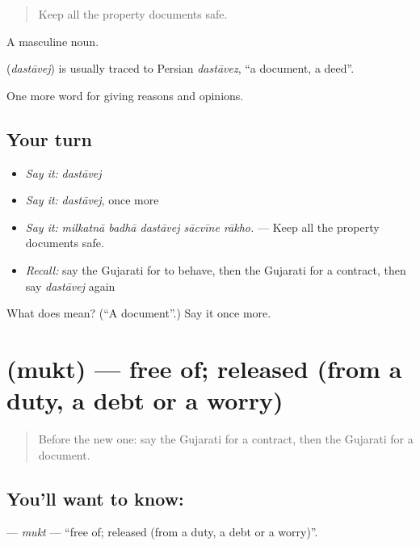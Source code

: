 \begin{quote}
Keep all the property documents safe.
\end{quote}

A masculine noun.

\begin{cousinweb}
\textbf{} (\emph{dastāvej}) is usually traced to Persian \emph{dastāvez}, \textquotedblleft{}a document, a deed\textquotedblright{}.
\end{cousinweb}

\begin{grammarlens}[title={What you've built}]
One more word for giving reasons and opinions.
\end{grammarlens}

\subsection*{Your turn}
\begin{itemize}
\raggedright
  \item \emph{Say it:} \emph{dastāvej}
  \item \emph{Say it:} \emph{dastāvej}, once more
  \item \emph{Say it:} \emph{milkatnā badhā dastāvej sācvīne rākho.} — Keep all the property documents safe.
  \item \emph{Recall:} say the Gujarati for to behave, then the Gujarati for a contract, then say \emph{dastāvej} again
\end{itemize}

\begin{tcolorbox}[breakable,colback=teal!4,colframe=teal!35!black,title={Before you move on}]
What does  mean? (\textquotedblleft{}A document\textquotedblright{}.) Say it once more.
\end{tcolorbox}
\section[\texorpdfstring{\gu{મુક્ત} (mukt)}{મુક્ત (mukt)}]{ (mukt) — free of; released (from a duty, a debt or a worry)}

\label{lesson:GU-C350-mukt}



\begin{quote}
Before the new one: say the Gujarati for a contract, then the Gujarati for a document.
\end{quote}

\subsection*{You'll want to know: }
\textbf{} — \emph{mukt} — \textquotedblleft{}free of; released (from a duty, a debt or a worry)\textquotedblright{}.

